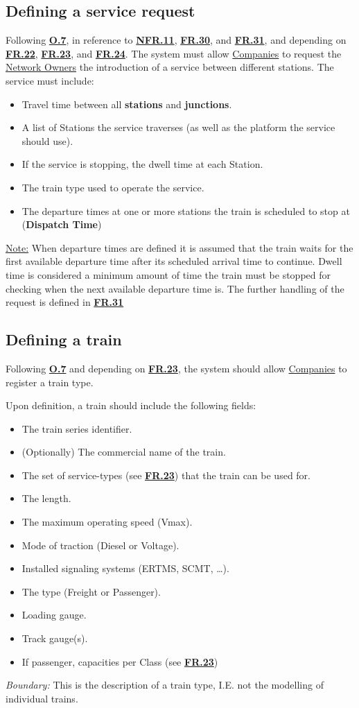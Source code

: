 \documentclass[12pt]{article}
\renewcommand\bf[1]{\textbf{#1}}
\renewcommand\it[1]{\textit{#1}}
\newcommand\un[1]{\underline{#1}}
\newcommand\hyl[1]{\hyperref[#1]{\bf{#1}}}
\begin{document}
\subsection{Defining a service request} \label{FR.21}
Following \hyl{O.7}, in reference to \hyl{NFR.11}, \hyl{FR.30}, and \hyl{FR.31}, and depending on \hyl{FR.22}, \hyl{FR.23}, and \hyl{FR.24}.
The system must allow \un{Companies} to request the \un{Network Owners} the introduction of a service between different stations.
The service must include:
\begin{itemize}
	\item Travel time between all \bf{stations} and \bf{junctions}.
	\item A list of Stations the service traverses (as well as the platform the service should use).
	\item If the service is stopping, the dwell time at each Station.
	\item The train type used to operate the service.
	\item The departure times at one or more stations the train is scheduled to stop at (\bf{Dispatch Time})
\end{itemize}
\un{Note:} When departure times are defined it is assumed that the train waits for the first available departure time after its scheduled arrival time to continue.
Dwell time is considered a minimum amount of time the train must be stopped for checking when the next available departure time is.
The further handling of the request is defined in \hyl{FR.31}

\subsection{Defining a train} \label{FR.22}
Following \hyl{O.7} and depending on \hyl{FR.23}, the system should allow \un{Companies} to register a train type.

Upon definition, a train should include the following fields:
\begin{itemize}
	\item The train series identifier.
	\item (Optionally) The commercial name of the train.
	\item The set of service-types (see \hyl{FR.23}) that the train can be used for.
	\item The length.
	\item The maximum operating speed (Vmax).
	\item Mode of traction (Diesel or Voltage).
	\item Installed signaling systems (ERTMS, SCMT, \dots).
	\item The type (Freight or Passenger).
	\item Loading gauge.
	\item Track gauge(s).
	\item If passenger, capacities per Class (see \hyl{FR.23})
\end{itemize}
\it{Boundary:} This is the description of a train type, I.E. not the modelling of individual trains.
\end{document}
